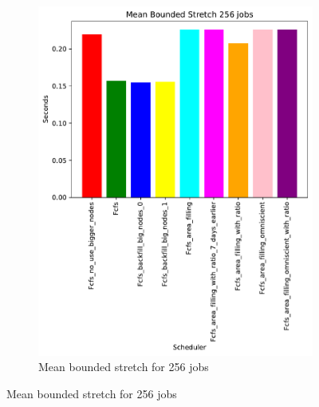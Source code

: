 \documentclass[a4paper]{article}
\begin{document}
\begin{figure}[H]
\begin{subfigure}[b]{0.4\linewidth}\centering\includegraphics[width=0.95\linewidth]{MBSS/plot/Size_Constraint_2022-01-17->2022-01-17_V9271_Mean_Stretch_With_a_Minimum_256_450_128_32_256_4_1024.pdf}\caption{Mean bounded stretch for 256 jobs}\label{45}\end{subfigure}

\end{figure}
\end{document}
